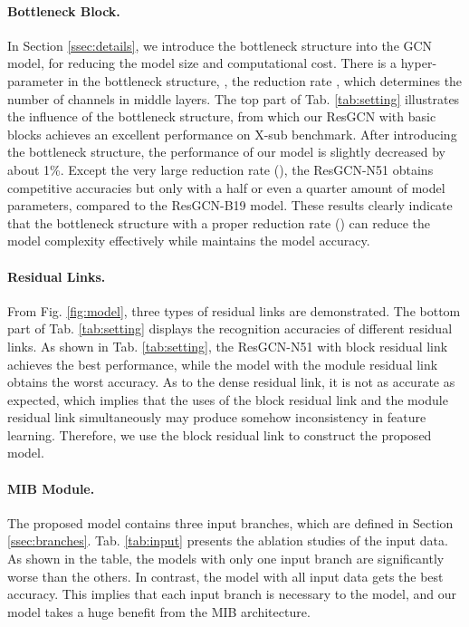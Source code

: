\documentclass[sigconf]{acmart}
\begin{document}
\paragraph{Bottleneck Block.} In Section \ref{ssec:details}, we introduce the bottleneck structure into the GCN model, for reducing the model size and computational cost. There is a hyper-parameter in the bottleneck structure, \ie, the reduction rate , which determines the number of channels in middle layers. The top part of Tab. \ref{tab:setting} illustrates the influence of the bottleneck structure, from which our ResGCN with basic blocks achieves an excellent performance on X-sub benchmark. After introducing the bottleneck structure, the performance of our model is slightly decreased by about 1\%. Except the very large reduction rate (), the ResGCN-N51 obtains competitive accuracies but only with a half or even a quarter amount of model parameters, compared to the ResGCN-B19 model. These results clearly indicate that the bottleneck structure with a proper reduction rate () can reduce the model complexity effectively while maintains the model accuracy.

\paragraph{Residual Links.} From Fig. \ref{fig:model}, three types of residual links are demonstrated. The bottom part of Tab. \ref{tab:setting} displays the recognition accuracies of different residual links. As shown in Tab. \ref{tab:setting}, the ResGCN-N51 with block residual link achieves the best performance, while the model with the module residual link obtains the worst accuracy. As to the dense residual link, it is not as accurate as expected, which implies that the uses of the block residual link and the module residual link simultaneously may produce somehow inconsistency in feature learning. Therefore, we use the block residual link to construct the proposed model.

\paragraph{MIB Module.} The proposed model contains three input branches, which are defined in Section \ref{ssec:branches}. Tab. \ref{tab:input} presents the ablation studies of the input data. As shown in the table, the models with only one input branch are significantly worse than the others. In contrast, the model with all input data gets the best accuracy. This implies that each input branch is necessary to the model, and our model takes a huge benefit from the MIB architecture.
\end{document}
